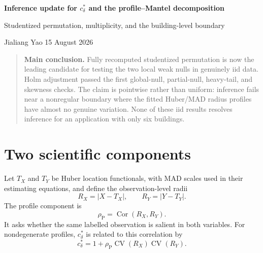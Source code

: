 
\providecommand{\cds}{c_\delta^\ast}
\providecommand{\rhoP}{\rho_{\mathrm{P}}}
\providecommand{\rhoM}{\rho_{\mathrm{M}}}

\begin{center}
{\LARGE\bfseries Inference update for $\cds$ and the profile--Mantel decomposition}\par
\vspace{0.4em}
{\large Studentized permutation, multiplicity, and the building-level boundary}\par
\vspace{0.6em}
Jialiang Yao \hfill 15 August 2026
\end{center}

\vspace{0.5em}
\begin{quote}
\textbf{Main conclusion.} Fully recomputed studentized permutation is now the
leading candidate for testing the two local weak nulls in genuinely iid data.
Holm adjustment passed the first global-null, partial-null, heavy-tail, and
skewness checks. The claim is pointwise rather than uniform: inference fails
near a nonregular boundary where the fitted Huber/MAD radius profiles have
almost no genuine variation. None of these iid results resolves inference for
an application with only six buildings.
\end{quote}

\section{Two scientific components}

Let $T_X$ and $T_Y$ be Huber location functionals, with MAD scales used in
their estimating equations, and define the observation-level radii
\begin{equation}
R_X=|X-T_X|, \qquad R_Y=|Y-T_Y|.
\end{equation}
The profile component is
\begin{equation}
\rhoP=\operatorname{Cor}(R_X,R_Y).
\end{equation}
It asks whether the same labelled observation is salient in both variables.
For nondegenerate profiles, $\cds$ is related to this correlation by
\begin{equation}
\cds=1+\rhoP\operatorname{CV}(R_X)\operatorname{CV}(R_Y).
\end{equation}

